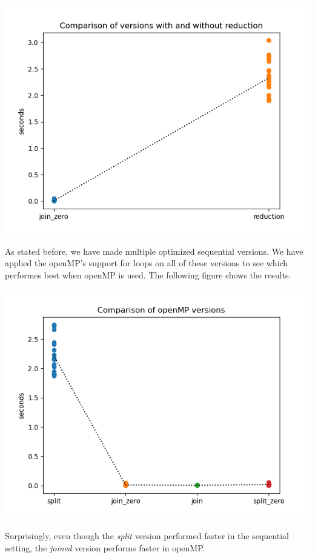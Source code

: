 \documentclass[a4paper]{article}
\begin{document}
\includegraphics[scale = 0.5]{../graphs/Comparison of versions with and without reduction.png}

As stated before, we have made multiple optimized sequential versions. We have applied the openMP's support for loops on all of these versions to see which performes best when openMP is used. The following figure shows the results.

\includegraphics[scale = 0.5]{../graphs/Comparison of openMP versions.png}

Surprisingly, even though the \textit{split} version performed faster in the sequential setting, the \textit{joined} version performs faster in openMP.
\end{document}
